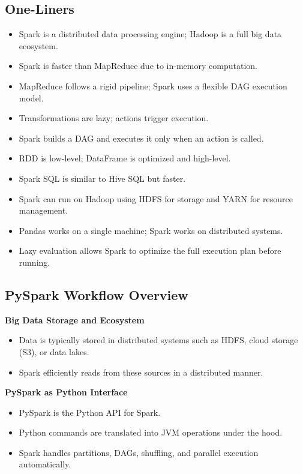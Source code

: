 \documentclass[10pt,a4paper]{article}
\begin{document}
	
	\subsection{One-Liners}

	\begin{itemize}
	    \item Spark is a distributed data processing engine; Hadoop is a full big data ecosystem.
	    \item Spark is faster than MapReduce due to in-memory computation.
	    \item MapReduce follows a rigid pipeline; Spark uses a flexible DAG execution model.
	    \item Transformations are lazy; actions trigger execution.
	    \item Spark builds a DAG and executes it only when an action is called.
	    \item RDD is low-level; DataFrame is optimized and high-level.
	    \item Spark SQL is similar to Hive SQL but faster.
	    \item Spark can run on Hadoop using HDFS for storage and YARN for resource management.
	    \item Pandas works on a single machine; Spark works on distributed systems.
	    \item Lazy evaluation allows Spark to optimize the full execution plan before running.
	\end{itemize}
	
	
	\subsection{PySpark Workflow Overview}
	
	\textbf{Big Data Storage and Ecosystem}
	\begin{itemize}
	    \item Data is typically stored in distributed systems such as HDFS, cloud storage (S3), or data lakes.
	    \item Spark efficiently reads from these sources in a distributed manner.
	\end{itemize}
	
	\textbf{PySpark as Python Interface}
	\begin{itemize}
	    \item PySpark is the Python API for Spark.
	    \item Python commands are translated into JVM operations under the hood.
	    \item Spark handles partitions, DAGs, shuffling, and parallel execution automatically.
	\end{itemize}
	
\end{document}
